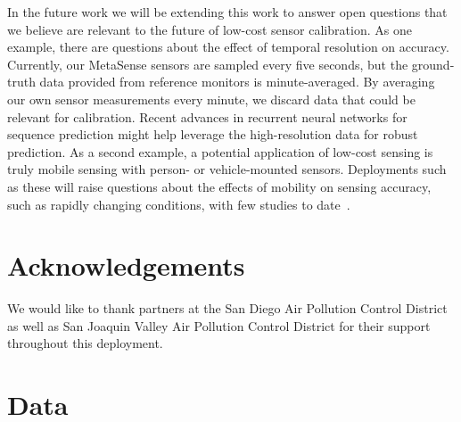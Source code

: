 \documentclass[journal abbreviation, manuscript]{copernicus}
\begin{document}
In the future work we will be extending this work to answer open questions that we believe are relevant to the future of low-cost sensor calibration.  As one example, there are questions about the effect of temporal resolution on accuracy. Currently, our MetaSense sensors are sampled every five seconds, but the ground-truth data provided from reference monitors is minute-averaged. By averaging our own sensor measurements every minute, we discard data that could be relevant for calibration. Recent advances in recurrent neural networks for sequence prediction might help leverage the high-resolution data for robust prediction. As a second example, a potential application of low-cost sensing is truly mobile sensing with person- or vehicle-mounted sensors. Deployments such as these will raise questions about the effects of mobility on sensing accuracy, such as rapidly changing conditions, with few studies to date~\citep{arfire2016mitigating}.


\section{Acknowledgements}

We would like to thank partners at the San Diego Air Pollution Control District as well as San Joaquin Valley Air Pollution Control District for their support throughout this deployment. 

\clearpage
\appendix
\setcounter{table}{0}

\iffalse
\section{Data}
\end{document}
